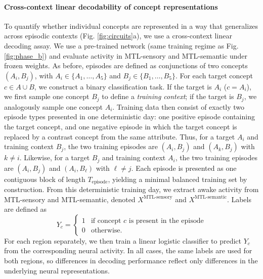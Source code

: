 \documentclass{article}
\begin{document}
\paragraph{Cross-context linear decodability of concept representations}
To quantify whether individual concepts are represented in a way that generalizes across episodic contexts (Fig. \ref{fig:circuits}a), we use a cross-context linear decoding assay. We use a pre-trained network (same training regime as Fig. \ref{fig:phase_b}) and evaluate activity in MTL-sensory and MTL-semantic under frozen weights. As before, episodes are defined as conjunctions of two concepts $(A_i,B_j)$, with $A_i \in \{A_1,\dots,A_5\}$ and $B_j \in \{B_1,\dots,B_5\}$.
\newline\newline
For each target concept $c \in A \cup B$, we construct a binary classification task. If the target is $A_i$ ($c = A_i$), we first sample one concept $B_j$ to define a \textit{training context}; if the target is $B_j$, we analogously sample one concept $A_i$. Training data then consist of exactly two episode types presented in one deterministic day: one positive episode containing the target concept, and one negative episode in which the target concept is replaced by a contrast concept from the same attribute. Thus, for a target $A_i$ and training context $B_j$, the two training episodes are $(A_i,B_j)$ and $(A_k,B_j)$ with $k \neq i$. Likewise, for a target $B_j$ and training context $A_i$, the two training episodes are $(A_i,B_j)$ and $(A_i,B_\ell)$ with $\ell \neq j$. Each episode is presented as one contiguous block of length $T_\textrm{episode}$, yielding a minimal balanced training set by construction.
\newline\newline
From this deterministic training day, we extract awake activity from MTL-sensory and MTL-semantic, denoted $X^\textrm{MTL-sensory}$ and $X^\textrm{MTL-semantic}$. Labels are defined as
\[
Y_c =
\begin{cases}
1 & \text{if concept } c \text{ is present in the episode} \\
0 & \text{otherwise.}
\end{cases}
\]
For each region separately, we then train a linear logistic classifier to predict $Y_c$ from the corresponding neural activity. In all cases, the same labels are used for both regions, so differences in decoding performance reflect only differences in the underlying neural representations.
\newline\newline
\end{document}
